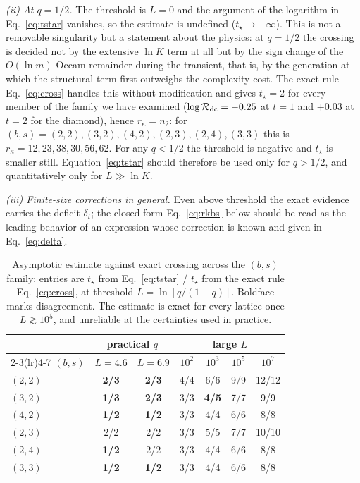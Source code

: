 \documentclass[preprint,12pt]{elsarticle}
\newcommand{\Rev}{\mathcal{R}}
\newcommand{\logR}{\log \Rev}
\newcommand{\rk}{r_{\kappa}}
\begin{document}
\emph{(ii) At $q=1/2$.} The threshold is $L=0$ and the argument of the
logarithm in Eq.~\eqref{eq:tstar} vanishes, so the estimate is undefined
($t_\star\to-\infty$). This is not a removable singularity but a statement
about the physics: at $q=1/2$ the crossing is decided not by the extensive
$\ln K$ term at all but by the sign change of the $O(\ln m)$ Occam remainder
during the transient, that is, by the generation at which the structural term
first outweighs the complexity cost. The exact rule Eq.~\eqref{eq:cross} handles this without
modification and gives $t_\star=2$ for every member of the family we have
examined ($\logR_{\rm dc}=-0.25$ at $t=1$ and $+0.03$ at $t=2$ for the
diamond), hence $\rk=n_2$: for $(b,s)=(2,2),(3,2),(4,2),(2,3),(2,4),(3,3)$ this
is $\rk=12,23,38,30,56,62$. For any $q<1/2$ the threshold is negative and
$t_\star$ is smaller still. Equation~\eqref{eq:tstar} should therefore be used
only for $q>1/2$, and quantitatively only for $L\gg\ln K$.

\emph{(iii) Finite-size corrections in general.} Even above threshold the exact
evidence carries the deficit $\delta_t$; the closed form
Eq.~\eqref{eq:rkbs} below should be read as the leading behavior of an
expression whose correction is known and given in Eq.~\eqref{eq:delta}.

\begin{table}[tb]
  \centering
  \caption{Asymptotic estimate against exact crossing across the $(b,s)$
  family: entries are $t_\star$ from Eq.~\eqref{eq:tstar} / $t_\star$ from the
  exact rule Eq.~\eqref{eq:cross}, at threshold $L=\ln[q/(1-q)]$. Boldface
  marks disagreement. The estimate is exact for every lattice once
  $L\gtrsim10^5$, and unreliable at the certainties used in practice.}
  \label{tab:validity}
  \begin{tabular}{lcccccc}
    \toprule
    & \multicolumn{2}{c}{practical $q$} & \multicolumn{4}{c}{large $L$}\\
    \cmidrule(lr){2-3}\cmidrule(lr){4-7}
    $(b,s)$ & $L=4.6$ & $L=6.9$ & $10^2$ & $10^3$ & $10^5$ & $10^7$\\
    \midrule
    $(2,2)$ & \textbf{2/3} & \textbf{2/3} & 4/4 & 6/6 & 9/9 & 12/12\\
    $(3,2)$ & \textbf{1/3} & \textbf{2/3} & 3/3 & \textbf{4/5} & 7/7 & 9/9\\
    $(4,2)$ & \textbf{1/2} & \textbf{1/2} & 3/3 & 4/4 & 6/6 & 8/8\\
    $(2,3)$ & 2/2 & 2/2 & 3/3 & 5/5 & 7/7 & 10/10\\
    $(2,4)$ & \textbf{1/2} & 2/2 & 3/3 & 4/4 & 6/6 & 8/8\\
    $(3,3)$ & \textbf{1/2} & \textbf{1/2} & 3/3 & 4/4 & 6/6 & 8/8\\
    \bottomrule
  \end{tabular}
\end{table}
\end{document}
